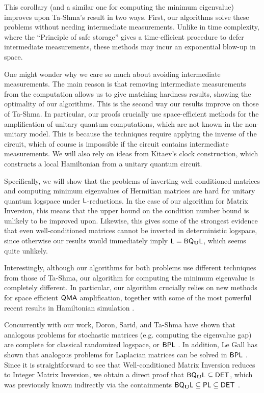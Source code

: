 \documentclass[11pt]{article}
\theoremstyle{definition}
\theoremstyle{remark}
\newcommand\DET{{\sf{DET}}}
\newcommand\PLclass{{\sf{PL}}}
\newcommand\QMA{{\sf{QMA}}}
\newcommand\Logspace{{\sf{L}}}
\newcommand\BPL{{\sf{BPL}}}
\newcommand{\classfont}{\sf}
\newcommand{\Unitary}{\mathbf{U}}
\newcommand{\unitaryBQL}{{\classfont{BQ}_\Unitary\classfont{L}}}
\begin{document}
This corollary (and a similar one for computing the minimum eigenvalue) improves upon Ta-Shma's result \cite{tashma} in two ways. First, our algorithms  solve these problems without needing intermediate measurements.  Unlike in time complexity, where the ``Principle of safe storage'' gives a time-efficient procedure to defer intermediate measurements, these methods may incur an exponential blow-up in space.  

One might wonder why we care so much about avoiding intermediate measurements.  The main reason is that removing intermediate measurements from the computation allows us to give matching hardness results, showing the optimality of our algorithms.  This is the second way our results improve on those of Ta-Shma.  In particular, our proofs crucially use space-efficient methods for the amplification of unitary quantum computations, which are not known in the non-unitary model.  This is because the techniques require applying the inverse of the circuit, which of course is impossible if the circuit contains intermediate measurements.  We will also rely on ideas from Kitaev's clock construction, which constructs a local Hamiltonian from a unitary quantum circuit. 

Specifically, we will show that the problems of inverting well-conditioned matrices and computing minimum eigenvalues of Hermitian matrices are hard for unitary quantum logspace under $\Logspace$-reductions. In the case of our algorithm for Matrix Inversion, this means that the upper bound on the condition number bound is unlikely to be improved upon.  Likewise, this gives some of the strongest evidence that even well-conditioned matrices cannot be inverted in deterministic logspace, since otherwise our results would immediately imply $\Logspace=\unitaryBQL$, which seems quite unlikely. 

Interestingly, although our algorithms for both problems use different techniques from those of Ta-Shma, our algorithm for computing the minimum eigenvalue is completely different.  In particular, our algorithm crucially relies on new methods for space efficient $\QMA$ amplification, together with some of the most powerful recent results in Hamiltonian simulation \cite{berry14,berry15}.

Concurrently with our work, Doron, Sarid, and Ta-Shma have shown that analogous problems for stochastic matrices (e.g. computing the eigenvalue gap) are complete for classical randomized logspace, or $\BPL$ \cite{dt15,dst16}. In addition, Le Gall has shown that analogous problems for Laplacian matrices can be solved in $\BPL$ \cite{legall16}. Since it is straightforward to see that Well-conditioned Matrix Inversion reduces to Integer Matrix Inversion, we obtain a direct proof that $\unitaryBQL\subseteq\DET$, which was previously known indirectly via the containments $\unitaryBQL\subseteq\PLclass\subseteq\DET$ \cite{Watrous03,Borodin84}.
\end{document}
